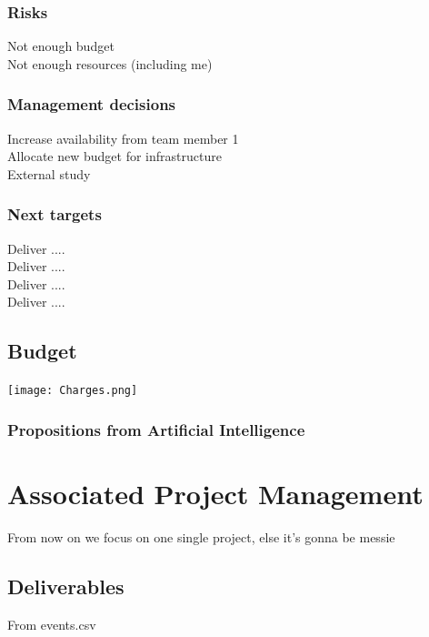 \documentclass[8pt]{article} %
\begin{document}
\subsubsection{Risks}

Not enough budget\\ 
Not enough resources (including me)\\

\subsubsection{Management decisions}

Increase availability from team member 1\\
Allocate new budget for infrastructure\\
External study\\

\subsubsection{Next targets}

Deliver ....\\
Deliver ....\\
Deliver ....\\
Deliver ....\\

\subsection{Budget}
\texttt{[image: Charges.png]}


\subsubsection{Propositions from Artificial Intelligence}


\section{Associated Project Management}

From now on we focus on one single project, else it's gonna be messie 
\subsection{Deliverables}
From events.csv
\end{document}

